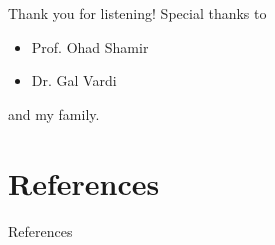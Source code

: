 \documentclass[handout,usenames,dvipsnames]{beamer} %
\begin{document}
\begin{frame}{Thank you for listening!}
Special thanks to
\begin{itemize}
    \item Prof. Ohad Shamir
    \item Dr. Gal Vardi
\end{itemize}
and my family.
\end{frame}



\section*{References}
\begin{frame}[allowframebreaks]{References} %
    
        
\end{frame}
\end{document}
